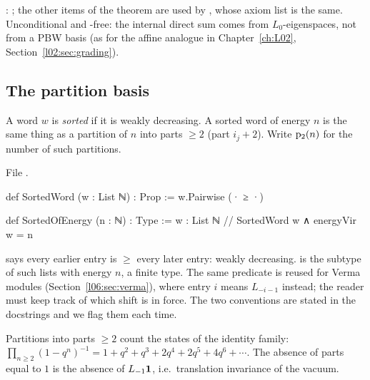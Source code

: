 \begin{status}
\allowbreak{}\allowbreak{}\allowbreak{}: \lean{[propext, Classical.}\allowbreak{}\allowbreak\lean{sound]}; the other
items of the theorem are used by , whose axiom list is the same. Unconditional and
-free: the internal direct sum comes from $L_0$-eigenspaces, not from a PBW basis (as for the
affine analogue in Chapter~\ref{ch:L02}, Section~\ref{l02:sec:grading}).
\end{status}

\subsection{The partition basis}

\begin{definition}\label{l06:def:sorted}
A word $w$ is \emph{sorted} if it is weakly decreasing. A sorted word of energy $n$ is the same thing
as a partition of $n$ into parts $\ge2$ (part $i_j+2$). Write $\mathrm{p}_{2}(n)$ for the number of such
partitions.
\end{definition}

File .
\begin{leancode}
def SortedWord (w : List ℕ) : Prop := w.Pairwise (· ≥ ·)

def SortedOfEnergy (n : ℕ) : Type := {w : List ℕ // SortedWord w ∧ energyVir w = n}
\end{leancode}

\begin{dictionary}
 says every earlier entry is $\ge$ every later entry: weakly decreasing.
 is the subtype of such lists with energy $n$, a finite type. The same predicate
 is reused for Verma modules (Section~\ref{l06:sec:verma}), where entry $i$ means
$L_{-i-1}$ instead; the reader must keep track of which shift is in force. The two conventions are
stated in the docstrings and we flag them each time.
\end{dictionary}

\begin{physics}
Partitions into parts $\ge2$ count the states of the identity family: $\prod_{n\ge2}(1-q^n)^{-1} =
1+q^2+q^3+2q^4+2q^5+4q^6+\cdots$. The absence of parts equal to $1$ is the absence of $L_{-1}\mathbf{1}$,
i.e.\ translation invariance of the vacuum.
\end{physics}

